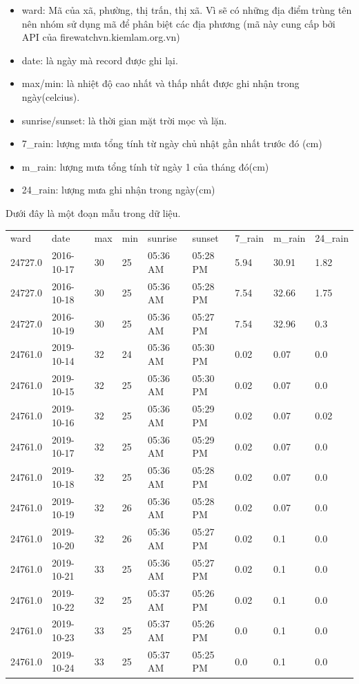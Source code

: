 \documentclass{article}
\begin{document}
\begin{itemize}
	\item ward: Mã của xã, phường, thị trấn, thị xã. Vì sẽ có những địa điểm trùng tên nên nhóm sử dụng mã để phân biệt các địa phương (mã này cung cấp bởi API của firewatchvn.kiemlam.org.vn\cite{website:firewatch_administrative})
	\item date: là ngày mà record được ghi lại.
	\item max/min: là nhiệt độ cao nhất và thấp nhất được ghi nhận trong ngày(celcius).
	\item sunrise/sunset: là thời gian mặt trời mọc và lặn.
	\item 7\_rain: lượng mưa tổng tính từ ngày chủ nhật gần nhất trước đó (cm)
	\item m\_rain: lượng mưa tổng tính từ ngày 1 của tháng đó(cm)
	\item 24\_rain: lượng mưa ghi nhận trong ngày(cm)
\end{itemize}

Dưới đây là một đoạn mẫu trong dữ liệu.

\begin{table}[H]
	\begin{tabular}{lllllllll}
		ward    & date       & max & min & sunrise  & sunset   & 7\_rain & m\_rain & 24\_rain \\
		24727.0 & 2016-10-17 & 30  & 25  & 05:36 AM & 05:28 PM & 5.94    & 30.91   & 1.82     \\
		24727.0 & 2016-10-18 & 30  & 25  & 05:36 AM & 05:28 PM & 7.54    & 32.66   & 1.75     \\
		24727.0 & 2016-10-19 & 30  & 25  & 05:36 AM & 05:27 PM & 7.54    & 32.96   & 0.3      \\
		24761.0 & 2019-10-14 & 32  & 24  & 05:36 AM & 05:30 PM & 0.02    & 0.07    & 0.0      \\
		24761.0 & 2019-10-15 & 32  & 25  & 05:36 AM & 05:30 PM & 0.02    & 0.07    & 0.0      \\
		24761.0 & 2019-10-16 & 32  & 25  & 05:36 AM & 05:29 PM & 0.02    & 0.07    & 0.02     \\
		24761.0 & 2019-10-17 & 32  & 25  & 05:36 AM & 05:29 PM & 0.02    & 0.07    & 0.0      \\
		24761.0 & 2019-10-18 & 32  & 25  & 05:36 AM & 05:28 PM & 0.02    & 0.07    & 0.0      \\
		24761.0 & 2019-10-19 & 32  & 26  & 05:36 AM & 05:28 PM & 0.02    & 0.07    & 0.0      \\
		24761.0 & 2019-10-20 & 32  & 26  & 05:36 AM & 05:27 PM & 0.02    & 0.1     & 0.0      \\
		24761.0 & 2019-10-21 & 33  & 25  & 05:36 AM & 05:27 PM & 0.02    & 0.1     & 0.0      \\
		24761.0 & 2019-10-22 & 32  & 25  & 05:37 AM & 05:26 PM & 0.02    & 0.1     & 0.0      \\
		24761.0 & 2019-10-23 & 33  & 25  & 05:37 AM & 05:26 PM & 0.0     & 0.1     & 0.0      \\
		24761.0 & 2019-10-24 & 33  & 25  & 05:37 AM & 05:25 PM & 0.0     & 0.1     & 0.0
	\end{tabular}
\end{table}
\end{document}
